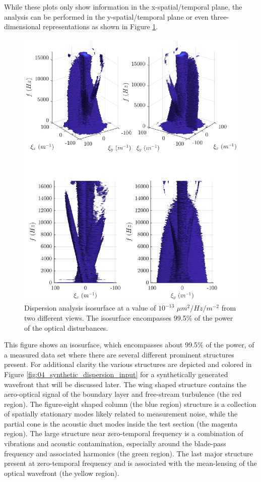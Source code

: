 While these plots only show information in the x-spatial/temporal plane, the analysis can be performed in the y-spatial/temporal plane or even three-dimensional representations as shown in Figure \ref{fig:04_dispersion_real}.
\begin{figure}
 \centering
 \includegraphics{../matlab/04_basic_filtering/dispersion_real.eps}
 \caption{Dispersion analysis isosurface at a value of $10^{-13}$ $\mu m^2/Hz/m^{-2}$ from two different views.  The isosurface encompasses 99.5\% of the power of the optical disturbances.}
 \label{fig:04_dispersion_real}
\end{figure}
This figure shows an isosurface, which encompasses about 99.5\% of the power, of a measured data set where there are several different prominent structures present.
For additional clarity the various structures are  depicted and colored in Figure \ref{fig:04_synthetic_dispersion_input} for a synthetically generated wavefront that will be discussed later.
The wing shaped structure contains the aero-optical signal of the boundary layer and free-stream turbulence (the red region).
The figure-eight shaped column (the blue region) structure is a collection of spatially stationary modes likely related to measurement noise, while the partial cone is the acoustic duct modes inside the test section (the magenta region).
The large structure near zero-temporal frequency is a combination of vibrations and acoustic contamination, especially around the blade-pass frequency and associated harmonics (the green region).
The last major structure present at zero-temporal frequency and is associated with the mean-lensing of the optical wavefront (the yellow region).

